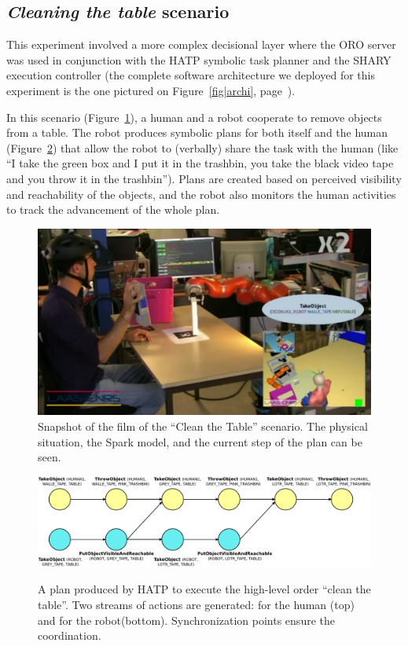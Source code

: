 \documentclass[preprint,3p,times]{elsarticle}
\begin{document}
\subsection{\emph{Cleaning the table} scenario}

This experiment involved a more complex decisional layer where the ORO server
was used in conjunction with the HATP symbolic task planner and the SHARY
execution controller (the complete software architecture we deployed for this
experiment is the one pictured on Figure~\ref{fig|archi},
page~\pageref{fig|archi}).

In this scenario (Figure~\ref{fig|cleantable-video}), a human and a robot
cooperate to remove objects from a table. The robot produces symbolic plans for
both itself and the human (Figure~\ref{plan-etat2})
that allow the robot to (verbally) share the task with the human (like ``I take
the green box and I put it in the trashbin, you take the black video tape and
you throw it in the trashbin''). Plans are created based on perceived
visibility and reachability of the objects, and the robot also monitors the
human activities to track the advancement of the whole plan.

\begin{figure}
    \centering
    \includegraphics[width=0.7\columnwidth]{cleantable.jpg}

    \caption{Snapshot of the film of the ``Clean the Table'' scenario. The
    physical situation, the {\sc Spark} model, and the current step of the plan can
    be seen.}

    \label{fig|cleantable-video}
\end{figure}

\begin{figure}[thpb]
  \centering
  \includegraphics[width=1.0\textwidth]{plan3.pdf} \\
  \caption {A plan produced by HATP to execute the high-level order ``clean the table''. Two streams of actions are generated: for the human (top) and for the robot(bottom). Synchronization points ensure the coordination.}
  \label{plan-etat2}
\end{figure}
\end{document}
